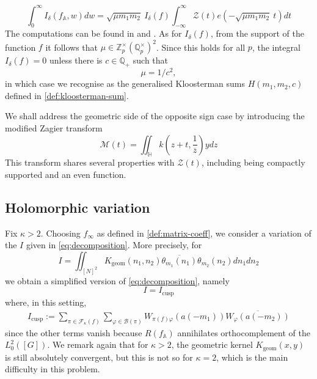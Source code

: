 \documentclass{article}
\numberwithin{equation}{section}
\begin{document}
\begin{equation}
    \int_{0}^{\infty}I_\delta(f_\mathbb{A},w)dw=\sqrt{\mu m_1m_2} \ I_\delta(f)\int_{-\infty}^{\infty}\mathcal{Z}(t)e(-\sqrt{\mu m_1 m_2}\ t)dt  
\end{equation}
The computations can be found in \cite[\S 7.5]{KL-kuznetsov} and \cite[\S 2.2.7]{generalised}. As for $I_\delta(f)$, from the support of the function $f$ it follows that $\mu \in \mathbb{Z}_p^\times (\mathbb{Q}_p^\times)^2$. Since this holds for all $p$, the integral $I_\delta(f)=0$ unless there is $c \in \mathbb{Q_+}$ such that
\begin{equation}\label{eq:parametrisation}
    \mu = 1/c^2,
\end{equation}
in which case we recognise as the generalised Kloosterman sums $H(m_1,m_2,c)$ defined in \eqref{def:kloosterman-sum}.


We shall address the geometric side of the opposite sign case by introducing the modified Zagier transform
\begin{equation}\label{def:modified-zagier}
    \mathcal{M}(t)=\iint_{\mathbb{H}}k(z+t,\frac{1}{\overline{z}})ydz
\end{equation}
This transform shares several properties with $\mathcal{Z}(t)$, including being compactly supported and an even function. 

\subsection{Holomorphic variation}\label{section:holomrophic-variation} Fix $\kappa > 2$. Choosing $f_\infty$ as defined in \eqref{def:matrix-coeff}, we consider a variation of the $I$ given in \eqref{eq:decomposition}. More precisely, for
\begin{equation}
    I= \iint_{[N]^2}K_\text{geom}(n_1,n_2)\overline{\theta_{m_1}(n_1)}\theta_{m_2}(n_2)dn_1 dn_2
\end{equation} we obtain a simplified version of \eqref{eq:decomposition}, namely
\begin{equation}\label{eq:I-holomorphic}
    I = I_\text{cusp}
\end{equation}
where, in this setting,
\begin{align}
    I_{\operatorname{cusp}} :=\sum_{\pi \in \mathcal{F}_\kappa(f)}\sum_{\varphi \in \mathcal{B}(\pi)}W_{\pi(f)\varphi}(a(-m_1))\overline{W_\varphi(a(-m_2))} 
\end{align}
since the other terms vanish because $R(f_\mathbb{A})$ annihilates orthocomplement of the $L_0^2([G])$. 
We remark again that for $\kappa > 2$, the geometric kernel $K_\text{geom}(x,y)$ is still absolutely convergent, but this is not so for $\kappa=2$, which is the main difficulty in this problem. \bigbreak
\end{document}
